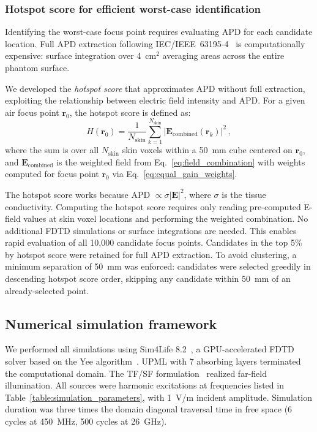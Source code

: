 \documentclass{iopjournal}
\begin{document}
\subsubsection{Hotspot score for efficient worst-case identification}
\label{sec:hotspot_score}
Identifying the worst-case focus point requires evaluating APD for each candidate location.
Full APD extraction following IEC/IEEE~63195-4~\citep{iec63195} is computationally expensive: surface integration over 4~cm$^2$ averaging areas across the entire phantom surface.


We developed the \emph{hotspot score} that approximates APD without full extraction, exploiting the relationship between electric field intensity and \gls{APD}.
For a given air focus point $\mathbf{r}_0$, the hotspot score is defined as:
\begin{equation}
H(\mathbf{r}_0) = \frac{1}{N_\mathrm{skin}} \sum_{k=1}^{N_\mathrm{skin}} \bigl|\mathbf{E}_\mathrm{combined}(\mathbf{r}_k)\bigr|^2 \,,
\label{eq:hotspot_score}
\end{equation}
where the sum is over all $N_\mathrm{skin}$ skin voxels within a 50~mm cube centered on $\mathbf{r}_0$, and $\mathbf{E}_\mathrm{combined}$ is the weighted field from Eq.~\eqref{eq:field_combination} with weights computed for focus point $\mathbf{r}_0$ via Eq.~\eqref{eq:equal_gain_weights}.

The hotspot score works because APD $\propto \sigma |\mathbf{E}|^2$, where $\sigma$ is the tissue conductivity. Computing the hotspot score requires only reading pre-computed E-field values at skin voxel locations and performing the weighted combination. No additional \gls{FDTD} simulations or surface integrations are needed.
This enables rapid evaluation of all 10,000 candidate focus points. Candidates in the top 5\% by hotspot score were retained for full APD extraction.
To avoid clustering, a minimum separation of 50~mm was enforced: candidates were selected greedily in descending hotspot score order, skipping any candidate within 50~mm of an already-selected point.

\subsection{Numerical simulation framework}
We performed all simulations using Sim4Life 8.2~\citep{sim4life}, a GPU-accelerated \gls{FDTD} solver based on the Yee algorithm~\citep{yee1966numerical,taflove2005computational}.
\Gls{UPML} with 7 absorbing layers terminated the computational domain.
The \gls{TF/SF} formulation~\citep{taflove2005computational} realized far-field illumination.
All sources were harmonic excitations at frequencies listed in Table~\ref{table:simulation_parameters}, with 1~V/m incident amplitude.
Simulation duration was three times the domain diagonal traversal time in free space (6 cycles at 450~MHz, 500 cycles at 26~GHz).
\end{document}
